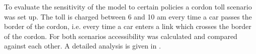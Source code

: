 To evaluate the sensitivity of the model to certain policies a cordon toll 
scenario was set up. The toll is charged between 6 and 10 am every time a car 
passes the border of the cordon, i.e. every time a car enters a link which 
crosses the border of the cordon. For both scenarios accessibility was 
calculated and compared against each other. A detailed analysis is given in 
\citet{RoederNagel2013SketchPlanningBrussels}.

